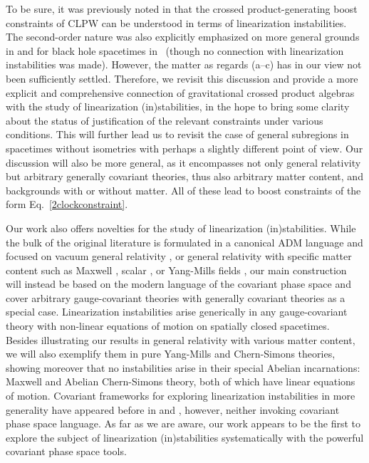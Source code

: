 \documentclass[]{jkpaper}
\theoremstyle{plain}
\theoremstyle{definition}
\begin{document}
To be sure, it was previously noted in \cite{Jensen:2023yxy,Kaplan:2024xyk} that the crossed product-generating boost constraints of CLPW \cite{Chandrasekaran:2022cip} can be understood in terms of linearization instabilities. The second-order nature was also explicitly emphasized on more general grounds in \cite{Jensen:2023yxy} and for black hole spacetimes in~\cite{Kudler-Flam:2023qfl} (though no connection with linearization instabilities was made). However, the matter as regards (a--c) has in our view not been sufficiently settled. Therefore, we revisit this discussion and provide a more explicit and comprehensive connection of gravitational crossed product algebras with the study of linearization (in)stabilities, in the hope to bring some clarity about the status of justification of the relevant constraints under various conditions. This will further lead us to revisit the case of general subregions in spacetimes without isometries \cite{Jensen:2023yxy} with perhaps a slightly different point of view.  Our discussion will also be more general, as it encompasses not only general relativity but arbitrary generally covariant theories, thus also arbitrary matter content, and backgrounds with or without matter. All of these lead to boost constraints of the form Eq.~\eqref{2clockconstraint}. 

Our work also offers novelties for the study of linearization (in)stabilities. While the bulk of the original literature is formulated in a canonical ADM language and focused on vacuum general relativity \cite{fischer1980structure,Arms:1982ea,Marsden_lectures,Deser:1973zza,Moncrief1,Moncrief:1976un,Arms:1982ea,Deser:1973zzb,choquet1979maximal}, or general relativity with specific matter content such as Maxwell \cite{Arms1}, scalar \cite{Saraykar:1981qm,Saraykar2}, or Yang-Mills fields \cite{Arms:1979au,Arms:1982ea,Altas:2021htf}, our main construction will instead be based on the modern language of the covariant phase space \cite{Kijowski:1973gi,Kijowski:1976ze} and cover arbitrary gauge-covariant theories with  generally covariant theories as a special case. Linearization instabilities arise generically in any gauge-covariant theory with non-linear equations of motion on spatially closed spacetimes. Besides illustrating our results in general relativity with various matter content, we will also exemplify them in pure Yang-Mills and Chern-Simons theories, showing moreover that no instabilities arise in their special Abelian incarnations: Maxwell and Abelian Chern-Simons theory, both of which have linear equations of motion. Covariant frameworks for exploring linearization instabilities in more generality have appeared before in \cite{Arms:1986vk} and \cite{Khavkine:2013iei}, however, neither invoking covariant phase space language. As far as we are aware, our work appears to be the first to explore the subject of linearization (in)stabilities systematically with the powerful covariant phase space tools. 
\end{document}
